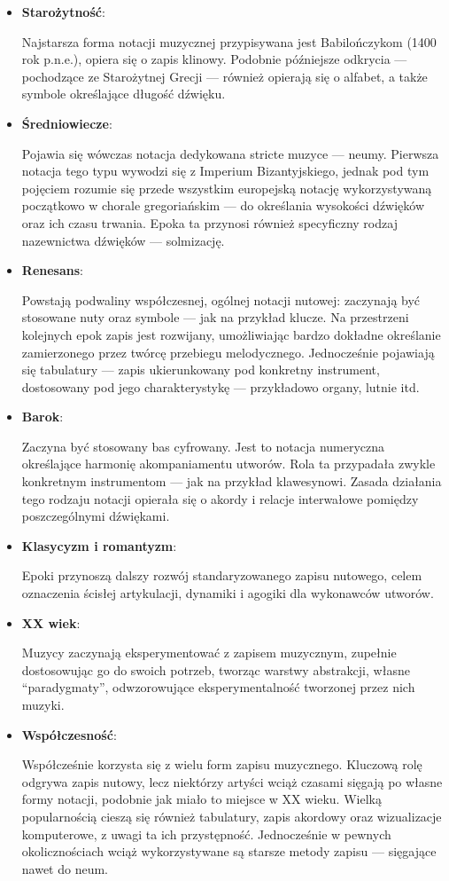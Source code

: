 \documentclass[12pt]{article}
\begin{document}
\begin{itemize}
	\item \textbf{Starożytność}:
	      
	      Najstarsza forma notacji muzycznej przypisywana jest Babilończykom (1400 rok p.n.e.), opiera się o zapis klinowy.
	      Podobnie późniejsze odkrycia — pochodzące ze Starożytnej Grecji — również opierają się o alfabet,
	      a także symbole określające długość dźwięku.
	\item \textbf{Średniowiecze}:
	      
	      Pojawia się wówczas notacja dedykowana stricte muzyce — neumy. Pierwsza notacja tego typu wywodzi się z Imperium Bizantyjskiego,
	      jednak pod tym pojęciem rozumie się przede wszystkim europejską notację wykorzystywaną początkowo w chorale
	      gregoriańskim — do określania wysokości dźwięków oraz ich czasu trwania.
	      Epoka ta przynosi również specyficzny rodzaj nazewnictwa dźwięków — solmizację.
	\item \textbf{Renesans}:
	      
	      Powstają podwaliny współczesnej, ogólnej notacji nutowej: zaczynają być stosowane nuty oraz symbole
	      — jak na przykład klucze.
	      Na przestrzeni kolejnych epok zapis jest rozwijany, umożliwiając bardzo dokładne określanie zamierzonego przez twórcę przebiegu
	      melodycznego.
	      Jednocześnie pojawiają się tabulatury — zapis ukierunkowany pod konkretny instrument, dostosowany pod jego charakterystykę —
	      przykładowo organy, lutnie itd.
	\item \textbf{Barok}:
	      
	      Zaczyna być stosowany bas cyfrowany.
	      Jest to notacja numeryczna określające harmonię akompaniamentu utworów.
	      Rola ta przypadała zwykle konkretnym instrumentom — jak na przykład klawesynowi.
	      Zasada działania tego rodzaju notacji opierała się o akordy i relacje interwałowe pomiędzy poszczególnymi dźwiękami.
	\item \textbf{Klasycyzm i romantyzm}:
	      
	      Epoki przynoszą dalszy rozwój standaryzowanego zapisu nutowego, celem oznaczenia ścisłej artykulacji, dynamiki i agogiki
	      dla wykonawców utworów.
	\item \textbf{XX wiek}:
	      
	      Muzycy zaczynają eksperymentować z zapisem muzycznym, zupełnie dostosowując go do swoich potrzeb, tworząc warstwy abstrakcji,
	      własne \enquote{paradygmaty}, odwzorowujące eksperymentalność tworzonej przez nich muzyki.
	\item \textbf{Współczesność}:
	      
	      Współcześnie korzysta się z wielu form zapisu muzycznego. Kluczową rolę odgrywa zapis nutowy,
	      lecz niektórzy artyści wciąż czasami sięgają po własne formy notacji, podobnie jak miało to miejsce w XX wieku.
	      Wielką popularnością cieszą się również tabulatury, zapis akordowy oraz wizualizacje komputerowe, z uwagi ta ich przystępność.
	      Jednocześnie w pewnych okolicznościach wciąż wykorzystywane są starsze metody zapisu — sięgające nawet do neum.
\end{itemize}
\end{document}
